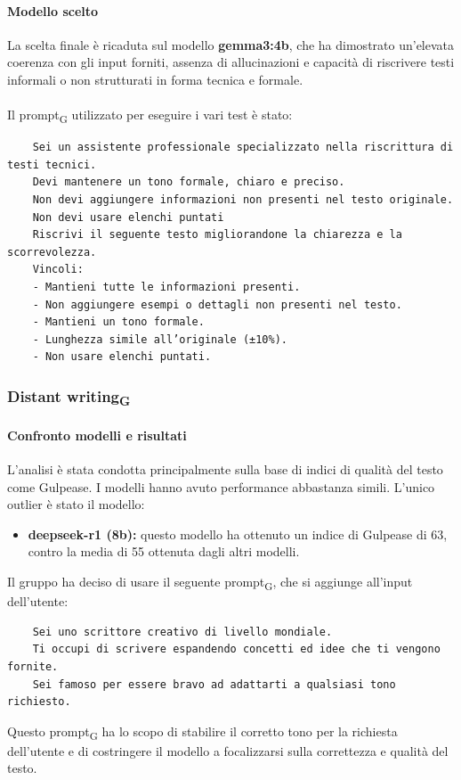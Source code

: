 \documentclass[11pt,a4paper]{article}
\newcommand{\gls}[1]{#1\textsubscript{G}}
\begin{document}
\paragraph{Modello scelto}
La scelta finale è ricaduta sul modello \textbf{gemma3:4b}, che ha dimostrato un'elevata coerenza con gli input forniti, assenza di allucinazioni e capacità di riscrivere testi informali o non strutturati in forma tecnica e formale.\\\\
Il \gls{prompt} utilizzato per eseguire i vari test è stato:
\begin{verbatim}
    Sei un assistente professionale specializzato nella riscrittura di testi tecnici.
    Devi mantenere un tono formale, chiaro e preciso.
    Non devi aggiungere informazioni non presenti nel testo originale.
    Non devi usare elenchi puntati
    Riscrivi il seguente testo migliorandone la chiarezza e la scorrevolezza.
    Vincoli:
    - Mantieni tutte le informazioni presenti.
    - Non aggiungere esempi o dettagli non presenti nel testo.
    - Mantieni un tono formale.
    - Lunghezza simile all’originale (±10%).
    - Non usare elenchi puntati.
\end{verbatim}

\subsubsection{\gls{Distant writing}}

 \paragraph{Confronto modelli e risultati}
 L'analisi è stata condotta principalmente sulla base di indici di qualità del testo come Gulpease.
 I modelli hanno avuto performance abbastanza simili. L'unico outlier è stato il modello:
 \begin{itemize}
    \item \textbf{deepseek-r1 (8b):} questo modello ha ottenuto un indice di Gulpease di 63, contro la media di 55 ottenuta dagli altri modelli.\\
 \end{itemize}
Il gruppo ha deciso di usare il seguente \gls{prompt}, che si aggiunge all'input dell'utente: 
\begin{verbatim}
    Sei uno scrittore creativo di livello mondiale.
    Ti occupi di scrivere espandendo concetti ed idee che ti vengono fornite. 
    Sei famoso per essere bravo ad adattarti a qualsiasi tono richiesto.
\end{verbatim} 
Questo \gls{prompt} ha lo scopo di stabilire il corretto tono per la richiesta dell'utente e di costringere il modello a focalizzarsi sulla correttezza e qualità del testo.
\end{document}
